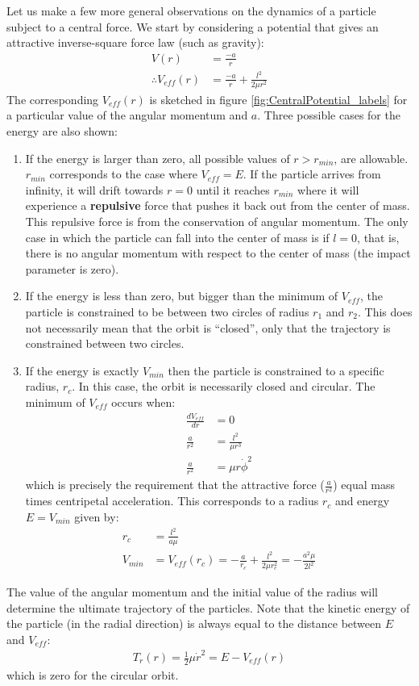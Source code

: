 Let us make a few more general observations on the dynamics of a particle subject to a central force. We start by considering a potential that gives an attractive inverse-square force law (such as gravity):
\begin{align}
V(r)&=\frac{-a}{r}\nonumber\\
\therefore V_{eff}(r)&= \frac{-a}{r}+\frac{l^2}{2\mu r^2}
\end{align}
The corresponding $V_{eff}(r)$ is sketched in figure \ref{fig:CentralPotential_labels} for a particular value of the angular momentum and $a$. Three possible cases for the energy are also shown:
\begin{enumerate}
\item If the energy is larger than zero, all possible values of $r>r_{min}$, are allowable. $r_{min}$ corresponds to the case where $V_{eff}=E$. If the particle arrives from infinity, it will drift towards $r=0$ until it reaches $r_{min}$ where it will experience a \textbf{repulsive} force that pushes it back out from the center of mass. This repulsive force is from the conservation of angular momentum. The only case in which the particle can fall into the center of mass is if $l=0$, that is, there is no angular momentum with respect to the center of mass (the impact parameter is zero).
\item If the energy is less than zero, but bigger than the minimum of $V_{eff}$, the particle is constrained to be between two circles of radius $r_1$ and $r_2$. This does not necessarily mean that the orbit is ``closed'', only that the trajectory is constrained between two circles.
\item If the energy is exactly $V_{min}$ then the particle is constrained to a specific radius, $r_c$. In this case, the orbit is necessarily closed and circular. The minimum of $V_{eff}$ occurs when:
\begin{align}
\frac{dV_{eff}}{dr}&=0\nonumber\\
\frac{a}{r^2}&=\frac{l^2}{\mu r^3}\nonumber\\
\frac{a}{r^2}&=\mu r \dot\phi^2
\end{align}
which is precisely the requirement that the attractive force ($\frac{a}{r^2}$) equal mass times centripetal acceleration. This corresponds to a radius $r_c$ and energy $E=V_{min}$ given by:
\begin{align}
r_c&=\frac{l^2}{a\mu}\nonumber\\
V_{min}&=V_{eff}(r_c)=-\frac{a}{r_c}+\frac{l^2}{2\mu r_c^2}=-\frac{a^2\mu}{2l^2}
\end{align}
\end{enumerate}
The value of the angular momentum and the initial value of the radius will determine the ultimate trajectory of the particles.
Note that the kinetic energy of the particle (in the radial direction) is always equal to the distance between $E$ and $V_{eff}$:
\begin{align}
T_r(r)=\frac{1}{2}\mu\dot r^2=E-V_{eff}(r)
\end{align}
which is zero for the circular orbit.

